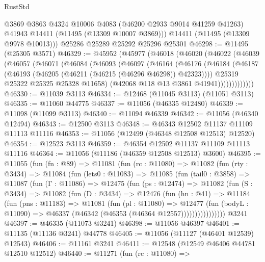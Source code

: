 \begin{lexlean}{RustStd}
\begin{coremodule}
        @3869
        @3863
        @4324
        @10006
        @4083
        (@46200 @2933 @9014 @41259 @41263)
        @41943
        @14411
        (@11495 (@13309 @10007 @3869)))
      @14411
      (@11495 (@13309 @9978 @10013)))
    @25286
    @25289
    @25292
    @25296
    @25301
@46298 := @11495 (@25305 @3571)
@46329 := @45952
    (@45977
      (@46018
        (@46020
          (@46022
            (@46039
              (@46057
                (@46071
                  (@46084
                    (@46093
                      (@46097
                        (@46164
                          (@46176
                            (@46184
                              (@46187 (@46193 (@46205 (@46211 (@46215 (@46296 @46298)) @42323))))
                              @25319
                              @25322
                              @25325
                              @25328
                              @11658)
                            (@42068 @118 @13 @3861 @41941)))))))))))))
@46330 := @11039 @3113
@46334 := @12468 (@11045 @3113) (@11051 @3113)
@46335 := @11060 @44775
@46337 := @11056 (@46335 @12480)
@46339 := @11098 (@11099 @3113)
@46340 := @11094 @46339
@46342 := @11056 (@46340 @12494)
@46343 := @12500 @3113
@46348 := @46343 @12502 @11137 @11109 @11113 @11116
@46353 := @11056 (@12499 (@46348 @12508 @12513) @12520)
@46354 := @12523 @3113
@46359 := @46354 @12502 @11137 @11109 @11113 @11116
@46364 := @11056 (@11186 (@46359 @12508 @12513) @3600)
@46395 := @11055
    (fun (fn : @89) =>
    @11081
      (fun (rc : @11080) =>
      @11082
        (fun (rty : @3434) =>
        @11084
          (fun (lets0 : @11083) =>
          @11085
            (fun (tail0 : @3858) =>
            @11087
              (fun (Γ : @11086) =>
              @12475
                (fun (ps : @12474) =>
                @11082
                  (fun (S : @3434) =>
                  @11082
                    (fun (D : @3434) =>
                    @12476
                      (fun (hn : @41) =>
                      @11184
                        (fun (pns : @11183) =>
                        @11081
                          (fun (pl : @11080) =>
                          @12477
                            (fun (bodyL : @11090) =>
                            @46337 (@46342 (@46353 (@46364 @12557))))))))))))))))
    @3241
@46397 := @46335 (@11073 @3241)
@46398 := @11056 @46397
@46401 := @11135 (@11136 @3241) @44778
@46405 := @11056 (@11127 (@46401 @12539) @12543)
@46406 := @11161 @3241
@46411 := @12548 (@12549 @46406 @44781 @12510 @12512)
@46440 := @11271
    (fun (rc : @11080) =>

\end{coremodule}
\end{lexlean}
